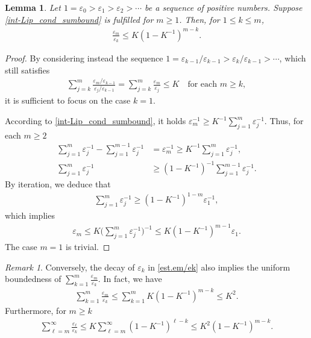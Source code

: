 \documentclass[reqno,12pt]{amsart} %
\newtheorem{lemma}[theorem]{Lemma}
\theoremstyle{definition}
\theoremstyle{remark}
\newtheorem{remark}[theorem]{Remark}
\numberwithin{equation}{section}
\begin{document}
\begin{lemma}\label{int-Lip_lem_varepsilon}
  Let $1=\varepsilon_0> \varepsilon_1>\varepsilon_2>\cdots$ be a sequence of positive numbers. Suppose \eqref{int-Lip_cond_sumbound} is fulfilled for $m\geq 1$. Then, for $1\leq k\leq m$,
  \begin{align}\label{est.em/ek}
    \frac{\varepsilon_m}{\varepsilon_{k}}\leq K(1-K^{-1})^{m-k}.
  \end{align}
\end{lemma}
\begin{proof}
  By considering instead the sequence $1=\varepsilon_{k-1}/\varepsilon_{k-1}>\varepsilon_{k}/\varepsilon_{k-1}>\cdots$, which still satisfies
  \begin{align*}
    \sum_{j=k}^{m} \frac{\varepsilon_m/\varepsilon_{k-1}}{\varepsilon_j/\varepsilon_{k-1}}=\sum_{j=k}^{m}\frac{\varepsilon_m}{\varepsilon_j}\leq K\quad \text{for each }m\geq k,
  \end{align*}
  it is sufficient to focus on the case $k=1$. 
  
  According to \eqref{int-Lip_cond_sumbound}, it holds $\varepsilon_m^{-1}\geq K^{-1}\sum_{j=1}^{m} \varepsilon_j^{-1}$. Thus, for each $m\geq 2$
\begin{align*}
  \sum_{j=1}^{m} \varepsilon_j^{-1}-\sum_{j=1}^{m-1} \varepsilon_j^{-1}&=\varepsilon_{m}^{-1}\geq K^{-1}\sum_{j=1}^{m} \varepsilon_j^{-1},\\
  \sum_{j=1}^{m} \varepsilon_j^{-1}&\geq (1-K^{-1})^{-1}\sum_{j=1}^{m-1} \varepsilon_j^{-1}.
\end{align*}
By iteration, we deduce that
\begin{align*}
  \sum_{j=1}^{m} \varepsilon_j^{-1}\geq (1-K^{-1})^{1-m}\varepsilon_1^{-1},
\end{align*}
which implies
\begin{align*}
  \varepsilon_m\leq K\bigg(\sum_{j=1}^{m} \varepsilon_j^{-1}\bigg)^{-1}\leq K(1-K^{-1})^{m-1}\varepsilon_1. 
\end{align*}
The case $m=1$ is trivial. 
\end{proof}

\begin{remark}\label{int-lip_remark_decay}
  Conversely, the decay of $\varepsilon_k$ in \eqref{est.em/ek} also implies the uniform boundedness of $\sum_{k=1}^m\frac{\varepsilon_m}{\varepsilon_k}$. In fact, we have
  \begin{align*}
      \sum_{k=1}^m\frac{\varepsilon_m}{\varepsilon_k}\leq \sum_{k=1}^m K(1-K^{-1})^{m-k}\leq K^2. 
  \end{align*}
  Furthermore, for $m\geq k$
 \begin{align*}
    \sum_{\ell=m}^\infty\frac{\varepsilon_\ell}{\varepsilon_k}\leq K\sum_{\ell=m}^\infty(1-K^{-1})^{\ell-k}\leq K^2(1-K^{-1})^{m-k}.
  \end{align*}
\end{remark}
\end{document}
